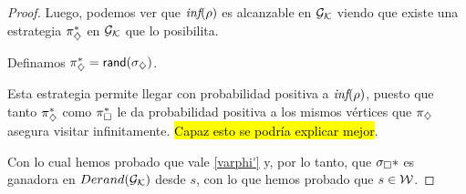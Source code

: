 \begin{proof}
	Luego, podemos ver que $\textit{inf}(\rho)$ es alcanzable en $\mathcal{G}_{\mathcal{K}}$ viendo que existe
	una estrategia $\pi_\diamondsuit^*$ en $\mathcal{G}_{\mathcal{K}}$ que lo posibilita.

	Definamos $\pi_\diamondsuit^* = \textsf{rand}(\sigma_\diamondsuit)$.

	Esta estrategia permite llegar con probabilidad positiva a $\textit{inf}(\rho)$,
	puesto que tanto $\pi_\diamondsuit^*$ como $\pi_\square^*$ le da probabilidad positiva a los
	mismos vértices que $\pi_\diamondsuit$ asegura visitar infinitamente. \hl{Capaz esto se
		podría explicar mejor}.

	Con lo cual hemos probado que vale \ref{varphi'} y, por lo tanto, que
	$\sigma_\square*$ es ganadora en $Derand(\mathcal{G}_{\mathcal{K}})$ desde $s$, con lo que hemos probado que
	$s \in \mathcal{W}$.

\end{proof}